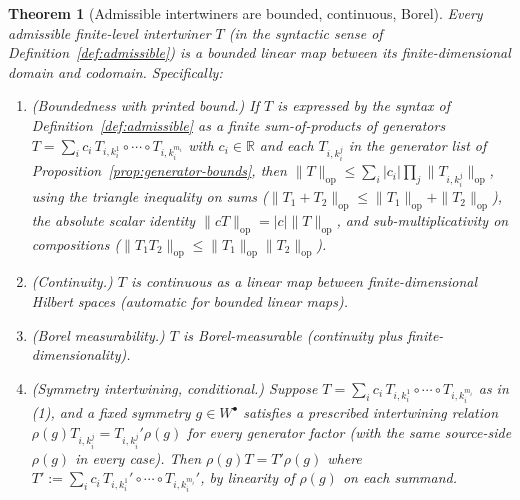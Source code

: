 \documentclass[11pt, a4paper]{amsart}
\newtheorem{theorem}{Theorem}[section]
\theoremstyle{definition}
\newcommand{\R}{\mathbb{R}}
\newcommand{\op}{\operatorname{op}}
\begin{document}
\begin{theorem}[Admissible intertwiners are bounded, continuous, Borel]
\label{thm:intertwiner-bounds}
Every admissible finite-level intertwiner $T$ (in the syntactic
sense of Definition~\ref{def:admissible}) is a bounded linear
map between its finite-dimensional domain and codomain.
Specifically:
\begin{enumerate}
\item (Boundedness with printed bound.) If $T$ is expressed by
  the syntax of Definition~\ref{def:admissible} as a finite
  sum-of-products of generators
  $T = \sum_i c_i \, T_{i, k_i^1} \circ \cdots \circ T_{i, k_i^{m_i}}$
  with $c_i \in \R$ and each $T_{i, k_i^j}$ in the generator
  list of Proposition~\ref{prop:generator-bounds}, then
  $\|T\|_{\op} \leq \sum_i |c_i| \prod_j \|T_{i, k_i^j}\|_{\op}$,
  using the triangle inequality on sums
  ($\|T_1 + T_2\|_{\op} \leq \|T_1\|_{\op} + \|T_2\|_{\op}$),
  the absolute scalar identity $\|c T\|_{\op} = |c| \|T\|_{\op}$,
  and sub-multiplicativity on compositions
  ($\|T_1 T_2\|_{\op} \leq \|T_1\|_{\op} \|T_2\|_{\op}$).
\item (Continuity.) $T$ is continuous as a linear map between
  finite-dimensional Hilbert spaces (automatic for bounded linear
  maps).
\item (Borel measurability.) $T$ is Borel-measurable (continuity
  plus finite-dimensionality).
\item (Symmetry intertwining, conditional.) Suppose
  $T = \sum_i c_i \, T_{i, k_i^1} \circ \cdots \circ
  T_{i, k_i^{m_i}}$ as in (1), and a fixed symmetry
  $g \in W^\bullet$ satisfies a prescribed intertwining relation
  $\rho(g) T_{i, k_i^j} = T_{i, k_i^j}' \rho(g)$ for every
  generator factor (with the same source-side $\rho(g)$ in every
  case). Then $\rho(g) T = T' \rho(g)$ where
  $T' := \sum_i c_i \, T_{i, k_i^1}' \circ \cdots \circ
  T_{i, k_i^{m_i}}'$, by linearity of $\rho(g)$ on each summand.
\end{enumerate}
\end{theorem}
\end{document}
